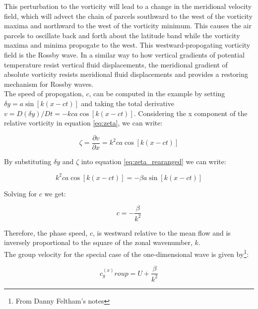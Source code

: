 \documentclass{article}
\begin{document}

This perturbation to the vorticity will lead to a change in the meridional velocity field, which will advect the chain of parcels southward to the west of the vorticity maxima and northward to the west of the vorticity minimum. This causes the air parcels to oscillate back and forth about the latitude band while the vorticity maxima and minima propogate to the west. This westward-propogating vorticity field is the Rossby wave. In a similar way to how vertical gradients of potential temperature resist vertical fluid displacements, the meridional gradient of absolute vorticity resists meridional fluid displacements and provides a restoring mechanism for Rossby waves.\\

The speed of propogation, $c$, can be computed in the example by setting $\delta y = a \sin[k(x - ct)]$ and taking the total derivative $v = D(\delta y)/Dt = -kca \cos[k(x - ct)]$. Considering the x component of the relative vorticity in equation \ref{eq:zeta}, we can write:

\begin{equation}
    \zeta  = \frac{\partial v}{\partial x} = k^2 ca \cos[k(x - ct)]
    \label{eq:zeta_x}
\end{equation}

By substituting $\delta y$ and $\zeta$ into equation \ref*{eq:zeta_rearanged} we can write:

\begin{equation}
    k^2 ca \cos[k(x - ct)] = -\beta a \sin[k(x - ct)]
    \label{eq:zeta_x_substitution}
\end{equation}

Solving for $c$ we get:

\begin{equation}
    c = -\frac{\beta}{k^2}
    \label{eq:zeta_x_substitution_c}
\end{equation}

Therefore, the phase speed, $c$, is westward relative to the mean flow and is inversely proportional to the square of the zonal wavenumber, $k$.\\
 
The group velocity for the special case of the one-dimensional wave is given by\footnote[2]{From Danny Feltham's notes}:

\begin{equation}
    c^{(x)}_group = U + \frac{\beta}{k^2}
    \label{eq:group_velocity}
\end{equation}
\end{document}
